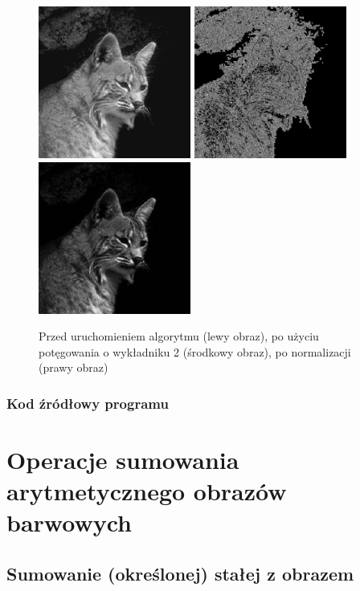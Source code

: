 \documentclass[a4paper,12pt]{book}
\begin{document}
\begin{figure}[H]
\caption{Przed uruchomieniem algorytmu (lewy obraz), po użyciu potęgowania o wykładniku 2 (środkowy obraz), po normalizacji (prawy obraz)}
\includegraphics[width=5cm, height=5cm]{cat-unmodified.jpg}
\includegraphics[width=5cm, height=5cm]{2-4/power-gray-cat-20.png}
\includegraphics[width=5cm, height=5cm]{2-4/power-gray-cat-20-norm.png}
\end{figure}

\subsection{Kod źródłowy programu}

\chapter{Operacje sumowania arytmetycznego obrazów barwowych}
\section{Sumowanie (określonej) stałej z obrazem}
\end{document}
